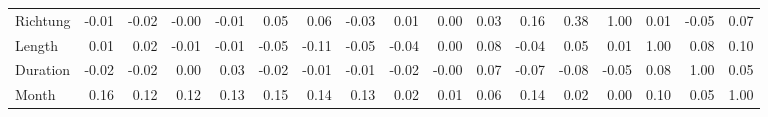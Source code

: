 \begin{tabular}{lrrrrrrrrrrrrrrrr}
Richtung & -0.01 & -0.02 & -0.00 & -0.01 &   0.05 &   0.06 & -0.03 &   0.01 &   0.00 & 0.03 &  0.16 &    0.38 &      1.00 &    0.01 &     -0.05 &   0.07 \\
Length   &  0.01 &  0.02 & -0.01 & -0.01 &  -0.05 &  -0.11 & -0.05 &  -0.04 &   0.00 & 0.08 & -0.04 &    0.05 &      0.01 &    1.00 &      0.08 &   0.10 \\
Duration & -0.02 & -0.02 &  0.00 &  0.03 &  -0.02 &  -0.01 & -0.01 &  -0.02 &  -0.00 & 0.07 & -0.07 &   -0.08 &     -0.05 &    0.08 &      1.00 &   0.05 \\
Month    &  0.16 &  0.12 &  0.12 &  0.13 &   0.15 &   0.14 &  0.13 &   0.02 &   0.01 & 0.06 &  0.14 &    0.02 &      0.00 &    0.10 &      0.05 &   1.00 \\
\bottomrule
\end{tabular}
